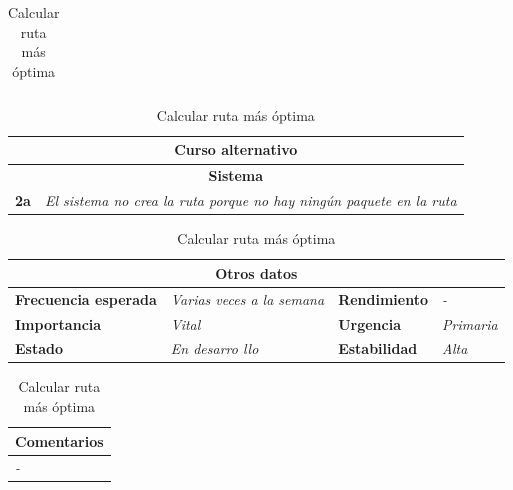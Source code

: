 \documentclass[12pt,spanish]{article}
\begin{document}
\begin{table}[H]
\begin{tabular}{|m{5pt}|m{7.33cm}|m{5pt}|m{7.33cm}|}
		
	\end{tabular}
	
	\vspace{0.5cm}
	
	\begin{tabular}{|m{12pt}|m{15.5cm}|}
		\hline
		\multicolumn{2}{|c|}{\textbf{Curso alternativo}} \\
		\hline
		\multicolumn{2}{|c|}{\textbf{Sistema}} \\
		\hline
		\textbf{2a} & \textit{El sistema no crea la ruta porque no hay ningún paquete en la ruta} \\
		\hline
	
		
	\end{tabular}
	
	\vspace{0.5cm}
	
	\begin{tabular}{|m{3.75cm}|m{3.75cm}|m{3.75cm}|m{3.8cm}|}
		\hline
		\multicolumn{4}{|c|}{\textbf{Otros datos}} \\
		\hline
		\textbf{Frecuencia esperada} & \textit{Varias veces a la semana} & \textbf{Rendimiento} & \textit{-} \\
		\hline
		\textbf{Importancia} & \textit{Vital} & \textbf{Urgencia} & \textit{Primaria} \\
		\hline
		\textbf{Estado} & \textit{En desarro
		llo} & \textbf{Estabilidad} & \textit{Alta} \\
		\hline
	\end{tabular}
	
	\vspace{1cm}
	
	\begin{tabular}{|m{16.2cm}|}
		\hline
		\textbf{Comentarios} \\
		\hline
		\textit{-} \\
		\hline
	\end{tabular}
	
	\caption{Calcular ruta más óptima}
	
\end{table}
\end{document}

